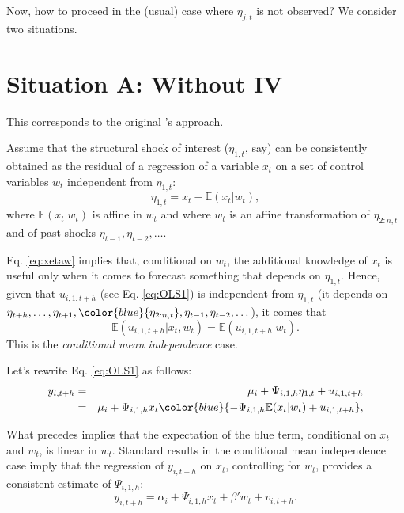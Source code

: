 \documentclass[
  12pt,
]{book}
\theoremstyle{definition}
\theoremstyle{definition}
\theoremstyle{definition}
\theoremstyle{definition}
\theoremstyle{remark}
\begin{document}
Now, how to proceed in the (usual) case where \(\eta_{j,t}\) is not observed? We consider two situations.

\hypertarget{situation-a-without-iv}{%
\section{Situation A: Without IV}\label{situation-a-without-iv}}

This corresponds to the original \citet{Jorda_2005}'s approach.

Assume that the structural shock of interest (\(\eta_{1,t}\), say) can be consistently obtained as the residual of a regression of a variable \(x_t\) on a set of control variables \(w_t\) independent from \(\eta_{1,t}\):
\begin{equation}
\eta_{1,t} = x_t - \mathbb{E}(x_t|w_t),\label{eq:xetaw}
\end{equation}
where \(\mathbb{E}(x_t|w_t)\) is affine in \(w_t\) and where \(w_t\) is an affine transformation of \(\eta_{2:n,t}\) and of past shocks \(\eta_{t-1},\eta_{t-2},\dots\).

Eq. \eqref{eq:xetaw} implies that, conditional on \(w_t\), the additional knowledge of \(x_t\) is useful only when it comes to forecast something that depends on \(\eta_{1,t}\). Hence, given that \(u_{i,1,t+h}\) (see Eq. \eqref{eq:OLS1}) is independent from \(\eta_{1,t}\) (it depends on \(\eta_{t+h},\dots,\eta_{t+1},\color{blue}{\eta_{2:n,t}},\eta_{t-1},\eta_{t-2},\dots\)), it comes that
\[
\mathbb{E}(u_{i,1,t+h}|x_t,w_t)= \mathbb{E}(u_{i,1,t+h}|w_t).
\]
This is the \emph{conditional mean independence} case.

Let's rewrite Eq. \eqref{eq:OLS1} as follows:
\begin{eqnarray*}
y_{i,t+h} &=& \mu_i + \Psi_{i,1,h}\eta_{1,t} + u_{i,1,t+h}\\
&=&  \mu_i + \Psi_{i,1,h}x_t  \color{blue}{-\Psi_{i,1,h}\mathbb{E}(x_t|w_t) + u_{i,1,t+h}},
\end{eqnarray*}

What precedes implies that the expectation of the blue term, conditional on \(x_t\) and \(w_t\), is linear in \(w_t\). Standard results in the conditional mean independence case imply that the regression of \(y_{i,t+h}\) on \(x_t\), controlling for \(w_t\), provides a consistent estimate of \(\Psi_{i,1,h}\):
\begin{equation}
y_{i,t+h} = \alpha_i + \Psi_{i,1,h}x_t + \beta'w_t + v_{i,t+h}.
\end{equation}
\end{document}
